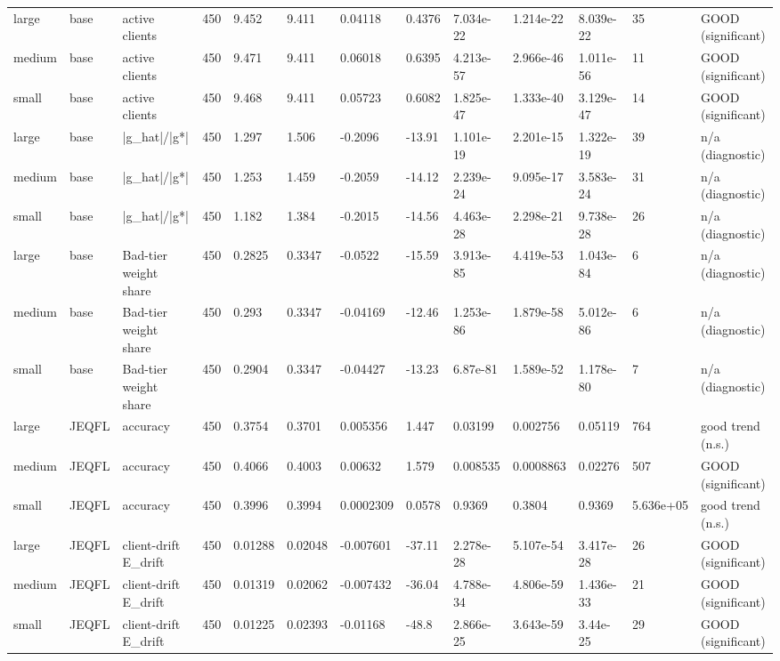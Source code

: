 \begin{table}[t]
\begin{tabular}{lllllllllllll}
large & base & active clients & 450 & 9.452 & 9.411 & 0.04118 & 0.4376 & 7.034e-22 & 1.214e-22 & 8.039e-22 & 35 & GOOD (significant) \\
medium & base & active clients & 450 & 9.471 & 9.411 & 0.06018 & 0.6395 & 4.213e-57 & 2.966e-46 & 1.011e-56 & 11 & GOOD (significant) \\
small & base & active clients & 450 & 9.468 & 9.411 & 0.05723 & 0.6082 & 1.825e-47 & 1.333e-40 & 3.129e-47 & 14 & GOOD (significant) \\
large & base & |g\_hat|/|g*| & 450 & 1.297 & 1.506 & -0.2096 & -13.91 & 1.101e-19 & 2.201e-15 & 1.322e-19 & 39 & n/a (diagnostic) \\
medium & base & |g\_hat|/|g*| & 450 & 1.253 & 1.459 & -0.2059 & -14.12 & 2.239e-24 & 9.095e-17 & 3.583e-24 & 31 & n/a (diagnostic) \\
small & base & |g\_hat|/|g*| & 450 & 1.182 & 1.384 & -0.2015 & -14.56 & 4.463e-28 & 2.298e-21 & 9.738e-28 & 26 & n/a (diagnostic) \\
large & base & Bad-tier weight share & 450 & 0.2825 & 0.3347 & -0.0522 & -15.59 & 3.913e-85 & 4.419e-53 & 1.043e-84 & 6 & n/a (diagnostic) \\
medium & base & Bad-tier weight share & 450 & 0.293 & 0.3347 & -0.04169 & -12.46 & 1.253e-86 & 1.879e-58 & 5.012e-86 & 6 & n/a (diagnostic) \\
small & base & Bad-tier weight share & 450 & 0.2904 & 0.3347 & -0.04427 & -13.23 & 6.87e-81 & 1.589e-52 & 1.178e-80 & 7 & n/a (diagnostic) \\
large & JEQFL & accuracy & 450 & 0.3754 & 0.3701 & 0.005356 & 1.447 & 0.03199 & 0.002756 & 0.05119 & 764 & good trend (n.s.) \\
medium & JEQFL & accuracy & 450 & 0.4066 & 0.4003 & 0.00632 & 1.579 & 0.008535 & 0.0008863 & 0.02276 & 507 & GOOD (significant) \\
small & JEQFL & accuracy & 450 & 0.3996 & 0.3994 & 0.0002309 & 0.0578 & 0.9369 & 0.3804 & 0.9369 & 5.636e+05 & good trend (n.s.) \\
large & JEQFL & client-drift E\_drift & 450 & 0.01288 & 0.02048 & -0.007601 & -37.11 & 2.278e-28 & 5.107e-54 & 3.417e-28 & 26 & GOOD (significant) \\
medium & JEQFL & client-drift E\_drift & 450 & 0.01319 & 0.02062 & -0.007432 & -36.04 & 4.788e-34 & 4.806e-59 & 1.436e-33 & 21 & GOOD (significant) \\
small & JEQFL & client-drift E\_drift & 450 & 0.01225 & 0.02393 & -0.01168 & -48.8 & 2.866e-25 & 3.643e-59 & 3.44e-25 & 29 & GOOD (significant) \\

\end{tabular}
\end{table}
